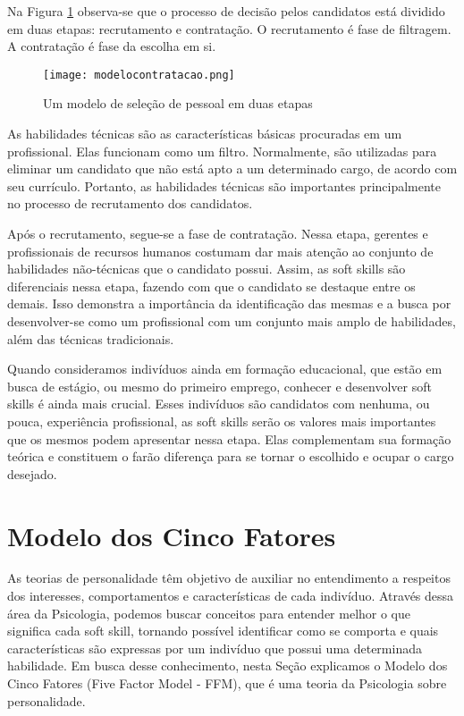 Na Figura \ref{fig:modelocontratacao} observa-se que o processo de decisão pelos candidatos está dividido em duas etapas: recrutamento e contratação. O recrutamento é fase de filtragem. A contratação é fase da escolha em si.

\begin{figure}[h*]
\centering
\caption{\small Um modelo de seleção de pessoal em duas etapas}
\texttt{[image: modelocontratacao.png]}
\label{fig:modelocontratacao}
\end{figure}

As habilidades técnicas são as características básicas procuradas em um profissional. Elas funcionam como um filtro. Normalmente, são utilizadas para eliminar um candidato que não está apto a um determinado cargo, de acordo com seu currículo. Portanto, as habilidades técnicas são importantes principalmente no processo de recrutamento dos candidatos.

Após o recrutamento, segue-se a fase de contratação. Nessa etapa, gerentes e profissionais de recursos humanos costumam dar mais atenção ao conjunto de habilidades não-técnicas que o candidato possui. Assim, as soft skills são diferenciais nessa etapa, fazendo com que o candidato se destaque entre os demais. Isso demonstra a importância da identificação das mesmas e a busca por desenvolver-se como um profissional com um conjunto mais amplo de habilidades, além das técnicas tradicionais.

Quando consideramos indivíduos ainda em formação educacional, que estão em busca de estágio, ou mesmo do primeiro emprego, conhecer e desenvolver soft skills é ainda mais crucial. Esses indivíduos são candidatos com nenhuma, ou pouca, experiência profissional, as soft skills serão os valores mais importantes que os mesmos podem apresentar nessa etapa. Elas complementam sua formação teórica e constituem o farão diferença para se tornar o escolhido e ocupar o cargo desejado.

\section{Modelo dos Cinco Fatores}
\label{sec:ffm}

As teorias de personalidade têm objetivo de auxiliar no entendimento a respeitos dos interesses, comportamentos e características de cada indivíduo. Através dessa área da Psicologia, podemos buscar conceitos para entender melhor o que significa cada soft skill, tornando possível identificar como se comporta e quais características são expressas por um indivíduo que possui uma determinada habilidade. Em busca desse conhecimento, nesta Seção explicamos o Modelo dos Cinco Fatores (Five Factor Model - FFM), que é uma teoria da Psicologia sobre personalidade.

